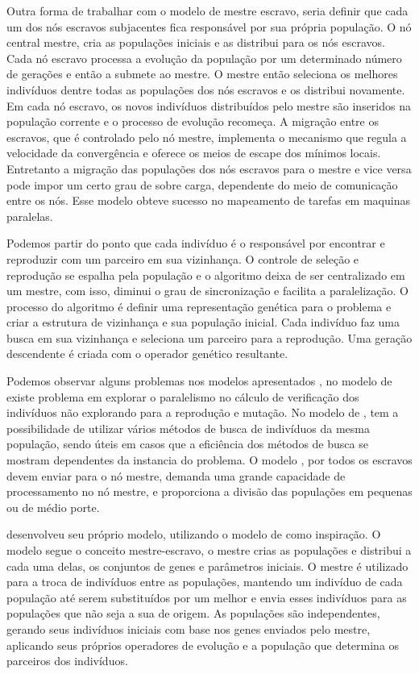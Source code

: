 Outra forma de trabalhar com o modelo de mestre escravo, seria definir que cada um dos nós escravos subjacentes fica responsável por sua própria população. O nó central mestre, cria as populações iniciais e as distribui para os nós escravos. Cada nó escravo processa a evolução da população por um determinado número de gerações e então a submete ao mestre. O mestre então seleciona os melhores indivíduos dentre todas as populações dos nós escravos e os distribui novamente. Em cada nó escravo, os novos indivíduos distribuídos pelo mestre são inseridos na população corrente e o processo de evolução recomeça. A migração entre os escravos, que é controlado pelo nó mestre, implementa o mecanismo que regula a velocidade da convergência e oferece os meios de escape dos mínimos locais. Entretanto a migração das populações dos nós escravos para o mestre e vice versa pode impor um certo grau de sobre carga, dependente do meio de comunicação entre os nós. Esse modelo obteve sucesso no mapeamento de tarefas em maquinas paralelas. \cite{Alaoui}

Podemos partir do ponto que cada indivíduo é o responsável por encontrar e reproduzir com um parceiro em sua vizinhança. O controle de seleção e reprodução se espalha pela população e o algoritmo deixa de ser centralizado em um mestre, com isso, diminui o grau de sincronização e facilita a paralelização. O processo do algoritmo é definir uma representação genética para o problema e criar a estrutura de vizinhança e sua população inicial. Cada indivíduo faz uma busca em sua vizinhança e seleciona um parceiro para a reprodução. Uma geração descendente é criada com o operador genético resultante. \cite{Heinz}

Podemos observar alguns problemas nos modelos apresentados \cite{Vilson}, no modelo de \cite{Jason} existe problema em explorar o paralelismo no cálculo de verificação dos indivíduos não explorando para a reprodução e mutação. No modelo de \cite{Heinz}, tem a possibilidade de utilizar vários métodos de busca de indivíduos da mesma população, sendo úteis em casos que a eficiência dos métodos de busca se mostram dependentes da instancia do problema. O modelo \cite{Alaoui}, por todos os escravos devem enviar para o nó mestre, demanda uma grande capacidade de processamento no nó mestre, e proporciona a divisão das populações em pequenas ou de médio porte.

 \cite{Vilson} desenvolveu seu próprio modelo, utilizando o modelo de \cite{Alaoui} como inspiração. O modelo segue o conceito mestre-escravo, o mestre crias as populações e distribui a cada uma delas, os conjuntos de genes e parâmetros iniciais. O mestre é utilizado para a troca de indivíduos entre as populações, mantendo um indivíduo de cada população até serem substituídos por um melhor e envia esses indivíduos para as populações que não seja a sua de origem. As populações são independentes, gerando seus indivíduos iniciais com base nos genes enviados pelo mestre, aplicando seus próprios operadores de evolução e a população que determina os parceiros dos indivíduos.